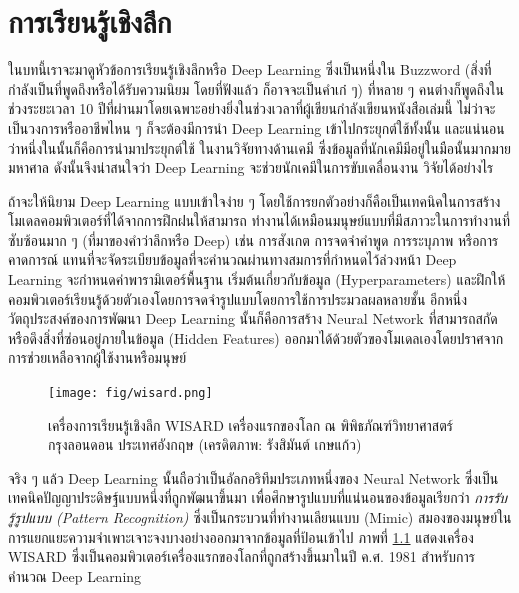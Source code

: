 

\chapter{การเรียนรู้เชิงลึก}
\label{ch:deep_learning}

ในบทนี้เราจะมาดูหัวข้อการเรียนรู้เชิงลึกหรือ Deep Learning ซึ่งเป็นหนึ่งใน Buzzword (สิ่งที่กำลังเป็นที่พูดถึงหรือได้รับความนิยม โดยที่ฟังแล้ว%
ก็อาจจะเป็นคำเก๋ ๆ) ที่หลาย ๆ คนต่างก็พูดถึงในช่วงระยะเวลา 10 ปีที่ผ่านมาโดยเฉพาะอย่างยิ่งในช่วงเวลาที่ผู้เขียนกำลังเขียนหนังสือเล่มนี้ 
ไม่ว่าจะเป็นวงการหรืออาชีพไหน ๆ ก็จะต้องมีการนำ Deep Learning เข้าไปกระยุกต์ใช้ทั้งนั้น และแน่นอนว่าหนึ่งในนั้นก็คือการนำมาประยุกต์ใช้%
ในงานวิจัยทางด้านเคมี ซึ่งข้อมูลที่นักเคมีมีอยู่ในมือนั้นมากมายมหาศาล ดังนั้นจึงน่าสนใจว่า Deep Learning จะช่วยนักเคมีในการขับเคลื่อนงาน%
วิจัยได้อย่างไร

ถ้าจะให้นิยาม Deep Learning แบบเข้าใจง่าย ๆ โดยใช้การยกตัวอย่างก็คือเป็นเทคนิคในการสร้างโมเดลคอมพิวเตอร์ที่ได้จากการฝึกฝนให้สามารถ%
ทำงานได้เหมือนมนุษย์แบบที่มีสภาวะในการทำงานที่ซับซ้อนมาก ๆ (ที่มาของคำว่าลึกหรือ Deep) เช่น การสังเกต การจดจำคำพูด การระบุภาพ 
หรือการคาดการณ์ แทนที่จะจัดระเบียบข้อมูลที่จะคำนวณผ่านทางสมการที่กำหนดไว้ล่วงหน้า Deep Learning จะกำหนดค่าพารามิเตอร์พื้นฐาน%
เริ่มต้นเกี่ยวกับข้อมูล (Hyperparameters) และฝึกให้คอมพิวเตอร์เรียนรู้ด้วยตัวเองโดยการจดจำรูปแบบโดยการใช้การประมวลผลหลายชั้น
อีกหนึ่งวัตถุประสงค์ของการพัฒนา Deep Learning นั้นก็คือการสร้าง Neural Network ที่สามารถสกัดหรือดึงสิ่งที่ซ่อนอยู่ภายในข้อมูล (Hidden 
Features) ออกมาได้ด้วยตัวของโมเดลเองโดยปราศจากการช่วยเหลือจากผู้ใช้งานหรือมนุษย์

\begin{figure}[htbp]
    \centering
    \texttt{[image: fig/wisard.png]}
    \caption{เครื่องการเรียนรู้เชิงลึก WISARD เครื่องแรกของโลก ณ พิพิธภัณฑ์วิทยาศาสตร์ กรุงลอนดอน ประเทศอังกฤษ 
    (เครดิตภาพ: รังสิมันต์ เกษแก้ว)}
    \label{fig:wisard}
\end{figure}

จริง ๆ แล้ว Deep Learning นั้นถือว่าเป็นอัลกอริทึมประเภทหนึ่งของ Neural Network ซึ่งเป็นเทคนิคปัญญาประดิษฐ์แบบหนึ่งที่ถูกพัฒนาขึ้นมา%
เพื่อศึกษารูปแบบที่แน่นอนของข้อมูลเรียกว่า \textit{การรับรู้รูปแบบ (Pattern Recognition)} ซึ่งเป็นกระบวนที่ทำงานเลียนแบบ (Mimic) 
สมองของมนุษย์ในการแยกแยะความจำเพาะเจาะจงบางอย่างออกมาจากข้อมูลที่ป้อนเข้าไป ภาพที่ \ref{fig:wisard} แสดงเครื่อง WISARD 
ซึ่งเป็นคอมพิวเตอร์เครื่องแรกของโลกที่ถูกสร้างขึ้นมาในปี ค.ศ. 1981 สำหรับการคำนวณ Deep Learning

